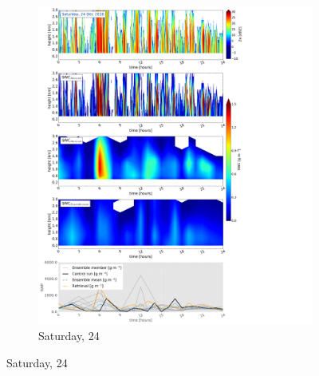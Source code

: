 \begin{figure}\ContinuedFloat
	\centering
	\begin{subfigure}[b]{0.8\textwidth}
		\includegraphics[trim={0.5cm 0.5cm 17.5cm .5cm},clip,width=\textwidth]{./fig_SWC/20161224}
		\caption{Saturday, \SI{24}{\dec}}\label{fig:SWC24}
	\end{subfigure}
\end{figure}
